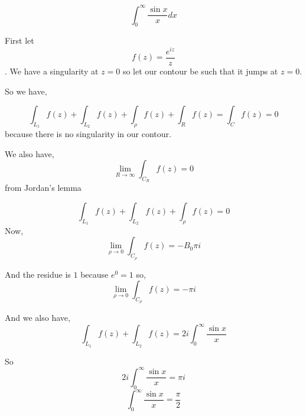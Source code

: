 \begin{eg}
   
   $$ \int_0^{\infty} \frac{\sin x}{x}dx $$ 

   First let $$f(z) = \frac{e^{iz}}{z}$$. We have a singularity at $z = 0$ so let our contour be such that it jumps at $z = 0$. 

   So we have, 
   
   
   $$ \int_{L_1}f(z) + \int_{L_2}f(z) + \int_{\rho}f(z) + \int_{R} f(z) = \int_C f(z) = 0$$  because there  is no singularity in our contour.
   
   We also have, 
   $$\lim_{R \to \infty}  \int_{C_R} f(z) =  0 $$  from Jordan's lemma 

   $$ \int_{L_1}f(z) + \int_{L_2}f(z) + \int_{\rho}f(z) = 0  $$ 
   Now, 
   $$ \lim_{\rho \to 0} \int_{C_\rho} f(z) = -B_0 \pi i  $$ 

   And the residue is $1$ because $e^{0} = 1$ so, 
   $$ \lim_{\rho \to 0} \int_{C_\rho} f(z) = -\pi i $$ 

   And we also have, 
   $$ \int_{L_1}f(z) + \int_{L_2} f(z) = 2i \int_0^{\infty}\frac{ \sin x }{x} $$ 

   So
$$2i \int_0^{\infty}\frac{ \sin x }{x}  = \pi i$$
$$ \int_0^{\infty}\frac{ \sin x }{x}  = \frac{\pi}{2}$$

\end{eg}



